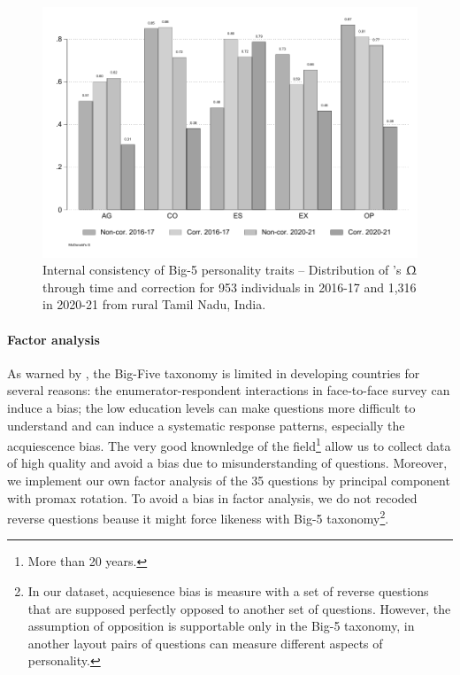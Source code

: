 \documentclass[a4paper, 11pt, onecolumn]{article}
\begin{document}
\begin{figure}[htpb]
\raggedright
\includegraphics[scale=0.8]{INPUT/omega}
\caption{Internal consistency of Big-5 personality traits -- Distribution of \citeauthor{McDonald1999}'s $\Upomega$ through time and correction for 953 individuals in 2016-17 and 1,316 in 2020-21 from rural Tamil Nadu, India.}
\label{fig:omega}
\end{figure}

\paragraph{Factor analysis}
As warned by \cite{Laajaj2019}, the Big-Five taxonomy is limited in developing countries for several reasons: the enumerator-respondent interactions in face-to-face survey can induce a bias; the low education levels can make questions more difficult to understand and can induce a systematic response patterns, especially the acquiescence bias.
The very good knownledge of the field\footnote{More than 20 years.} allow us to collect data of high quality and avoid a bias due to misunderstanding of questions.
Moreover, we implement our own factor analysis of the 35 questions by principal component with promax rotation.
To avoid a bias in factor analysis, we do not recoded reverse questions beause it might force likeness with Big-5 taxonomy\footnote{In our dataset, acquiesence bias is measure with a set of reverse questions that are supposed perfectly opposed to another set of questions.  However, the assumption of opposition is supportable only in the Big-5 taxonomy, in another layout pairs of questions can measure different aspects of personality.}.
\end{document}
